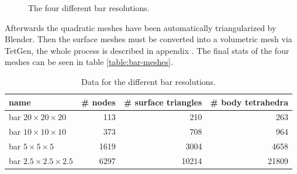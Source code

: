 \begin{figure}
  \centering
  \newline
  \caption{The four different bar resolutions.}
  \label{fig:blender-bars}
\end{figure}

Afterwards the quadratic meshes have been automatically triangularized
by Blender. Then the surface meshes must be converted into a
volumetric mesh via TetGen, the whole process is described in appendix
. The final stats of the four meshes can
be seen in table \vref{table:bar-meshes}.

\begin{table}
  \centering
  \begin{tabular}{| l | r | r | r |}
    \hline
    name & \# nodes & \# surface triangles & \# body tetrahedra \\
    \hline
    bar $20 \times 20 \times 20$ & 113 & 210 & 263 \\
    bar $10 \times 10 \times 10$ & 373 & 708 & 964\\
    bar $5 \times 5 \times 5$ & 1619 & 3004 & 4658 \\
    bar $2.5 \times 2.5 \times 2.5$ & 6297 & 10214 & 21809 \\
    \hline
  \end{tabular}
  \caption{Data for the different bar resolutions.}
  \label{table:bar-meshes}
\end{table}

